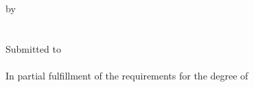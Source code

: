 \begin{center}
\vspace*{0cm}
\thispagestyle{empty}
\vspace*{-2cm}
{\Huge \bf \ttitlepagetitletop\ \\[0.5cm]}
{\sc \Large \ttitlepagesubtitletop\ \\[0.2cm]}
\vspace*{3cm}
by\\\vspace*{.2cm}
{\Large \tauthor}\\
\vspace*{2.5cm}
{\Large \scshape \ttitlepagetitlemiddle}\\
\vspace*{2.5cm}
{\large Submitted to}\\\vspace*{0.2cm}
{\Large \scshape \torganization}\\\vspace*{2.8cm}
{\large In partial fulfillment of the requirements for the degree of}\\\vspace*{0.5cm}
{\Large \ttitlepagesubtitlemiddle}\\\vspace*{2.2cm}
{\large \tsubmissiondate}\\\vspace*{0.3cm}
\end{center}
\clearpage
